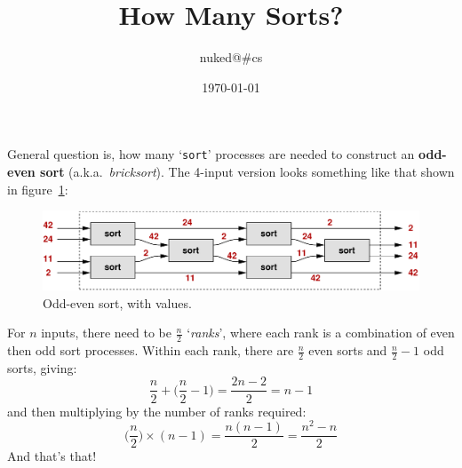 \documentclass[a4paper,12pt]{article}
\begin{document}
\title{How Many Sorts?}
\author{nuked@\#cs}
\date{\today}

\maketitle\thispagestyle{empty}

General question is, how many `{\small\tt sort}' processes are needed to construct an {\bf odd-even sort} (a.k.a.~{\em bricksort}).
The 4-input version looks something like that shown in figure~\ref{fig:sort}:

\begin{figure}[hbt]
	\centering
	\includegraphics[scale=0.6]{oddevensort.pdf}
	\caption{Odd-even sort, with values.}
	\label{fig:sort}
\end{figure}

For $n$ inputs, there need to be $\frac{n}{2}$ `{\em ranks}', where each rank is a combination of even then odd sort processes.
Within each rank, there are $\frac{n}{2}$ even sorts and $\frac{n}{2} - 1$ odd sorts, giving:
\begin{equation}
	\frac{n}{2} + \biggl(\frac{n}{2} - 1\biggr) = \frac{2n - 2}{2} = n-1
\end{equation}
and then multiplying by the number of ranks required:
\begin{equation}
	\biggl(\frac{n}{2}\biggr) \times (n-1) = \frac{n (n-1)}{2} = \frac{n^2 - n}{2}
\end{equation}
And that's that!
\end{document}
